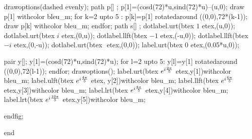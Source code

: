 \documentclass[12pt]{article}
\begin{document}
  drawoptions(dashed evenly);
  path p[] ;
  p[1]=(cosd(72)*u,sind(72)*u)--(u,0);
  draw p[1] withcolor  bleu_m;
  for k=2 upto 5 : p[k]=p[1] rotatedaround ((0,0),72*(k-1));
    draw p[k] withcolor bleu_m;
  endfor;
  path s[] ;
dotlabel.urt(btex $1$ etex,(u,0));
dotlabel.urt(btex $i$ etex,(0,u));
dotlabel.llft(btex $-1$ etex,(-u,0));
dotlabel.llft(btex $-i$ etex,(0,-u));
dotlabel.urt(btex $ $ etex,(0,0));
label.urt(btex $0$ etex,(0.05*u,0));



  pair y[];
  y[1]=(cosd(72)*u,sind(72)*u);
  for l=2 upto 5:
    y[l]=y[1] rotatedaround ((0,0),72(l-1));
  endfor;
  drawoptions();
  label.urt(btex $e^{i{2\pi \over 5}}$ etex,y[1])withcolor bleu_m;
  label.ulft(btex $e^{i{4\pi \over 5}}$ etex, y[2])withcolor bleu_m;
  label.llft(btex $e^{i{6\pi \over 5}}$ etex,y[3])withcolor bleu_m;
  label.lrt(btex  $e^{i{8\pi \over 5}}$ etex,y[4])withcolor bleu_m;
  label.lrt(btex $e^{i{10\pi \over 5}}$ etex,y[5])withcolor bleu_m;




 endfig;




end
\end{document}
